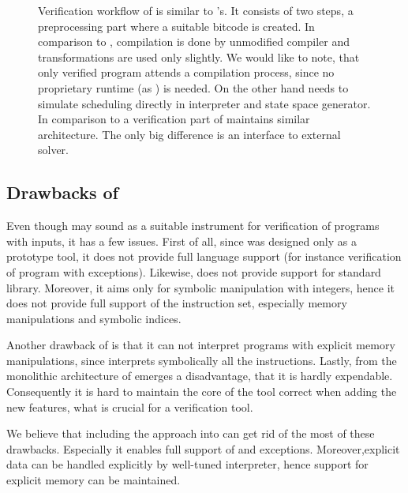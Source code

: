 \begin{figure}[!ht]
{
}
\caption{ Verification workflow of \SymDIVINE is similar to \DIVINE{}'s. It
    consists of two steps, a preprocessing part where a suitable \LLVM bitcode
    is created. In comparison to \DIVINE, compilation is done by unmodified
    compiler and \LART transformations are used only slightly. We would like to
    note, that only verified program attends a compilation process, since no
    \SymDIVINE proprietary runtime (as \DIOS) is needed. On the other hand
    \SymDIVINE needs to simulate scheduling directly in interpreter and state
    space generator. In comparison to \DIVINE a verification part of \SymDIVINE
    maintains similar architecture. The only big difference is an interface to
    external \SMT solver.}\label{fig:symdivine}
\end{figure}


\subsection{Drawbacks of \SymDIVINE}
Even though \SymDIVINE may sound as a suitable instrument for verification of
programs with inputs, it has a few issues. First of all, since
\SymDIVINE was designed only as a prototype tool, it does not provide full \Cpp{}
language support (for instance verification of program with exceptions).
Likewise, \SymDIVINE does not provide support for \Cpp{} standard library.
Moreover, it aims only for symbolic manipulation with integers, hence it
does not provide full support of the \LLVM instruction set, especially memory
manipulations and symbolic indices.

Another drawback of \SymDIVINE is that it can not interpret programs with
explicit memory manipulations, since \SymDIVINE interprets symbolically all the
instructions. Lastly, from the monolithic architecture of \SymDIVINE emerges a
disadvantage, that it is hardly expendable. Consequently it is hard to maintain
the core of the tool correct when adding the new features, what is
crucial for a verification tool.

We believe that including the \SymDIVINE approach into \DIVINE can get rid
of the most of these drawbacks. Especially it enables full support of \LLVM and
\Cpp{} exceptions. Moreover,explicit data can be handled explicitly by
well-tuned \DIVINE interpreter, hence support for explicit memory can be
maintained.

